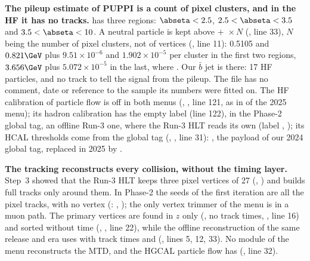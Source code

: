 \textbf{The pileup estimate of PUPPI is a count of pixel clusters, and in the HF it has no tracks.}
 has three regions: $\abseta<2.5$, $2.5<\abseta<3.5$ and $3.5<\abseta<10$. A
neutral particle is kept above  $+$ ${}\times N$
(, line 33), $N$ being the number of pixel clusters, not of vertices
(, line 11): 0.5105 and $0.821\GeV$ plus $9.51\times10^{-6}$ and
$1.902\times10^{-5}$ per cluster in the first two regions, $3.656\GeV$ plus $5.072\times10^{-5}$ in the last, where
. Our $\bar{b}$ jet is there: 17 HF particles, and no track to tell the signal from the pileup.
The file has no comment, date or reference to the sample its numbers were fitted on. The HF calibration of particle flow
is off in both menus (, , line 121,
as in  of the 2025 menu); its hadron calibration has the empty label (line 122),
 in the Phase-2 global tag, an offline Run-3 one, where the Run-3 HLT reads its
own (label , ); its HCAL thresholds come from the global tag
(, , line 31):
, the payload of our 2024 global tag, replaced in 2025 by .

\textbf{The tracking reconstructs every collision, without the timing layer.} Step~3 showed that the Run-3 HLT keeps three
pixel vertices of 27 (, ) and builds full tracks only around them.
In Phase-2 the seeds of the first iteration are all the pixel tracks, with no vertex
(: , ); the only
vertex trimmer of the menu is in a muon path. The primary vertices are found in $z$ only (, no track
times, , line 16) and sorted without time (,
, line 22), while the offline reconstruction of the same release and era uses
 with track times and 
(, lines 5, 12, 33). No module of the menu
reconstructs the MTD, and the HGCAL particle flow has  (, line 32).

